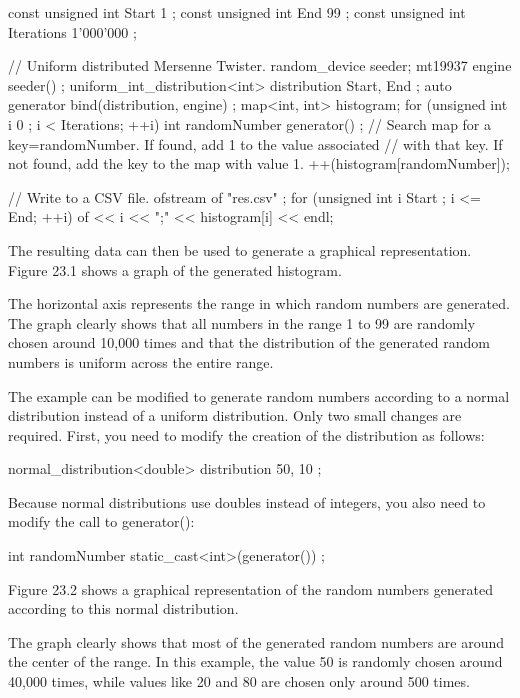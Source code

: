 \begin{cpp}
const unsigned int Start { 1 };
const unsigned int End { 99 };
const unsigned int Iterations { 1'000'000 };

// Uniform distributed Mersenne Twister.
random_device seeder;
mt19937 engine { seeder() };
uniform_int_distribution<int> distribution { Start, End };
auto generator { bind(distribution, engine) };
map<int, int> histogram;
for (unsigned int i { 0 }; i < Iterations; ++i) {
    int randomNumber { generator() };
    // Search map for a key=randomNumber. If found, add 1 to the value associated
    // with that key. If not found, add the key to the map with value 1.
    ++(histogram[randomNumber]);
}

// Write to a CSV file.
ofstream of { "res.csv" };
for (unsigned int i { Start }; i <= End; ++i) {
    of << i << ";" << histogram[i] << endl;
}
\end{cpp}

The resulting data can then be used to generate a graphical representation. Figure 23.1 shows a graph of the generated histogram.

The horizontal axis represents the range in which random numbers are generated. The graph clearly shows that all numbers in the range 1 to 99 are randomly chosen around 10,000 times and that the distribution of the generated random numbers is uniform across the entire range.


The example can be modified to generate random numbers according to a normal distribution instead of a uniform distribution. Only two small changes are required. First, you need to modify the creation of the distribution as follows:

\begin{cpp}
normal_distribution<double> distribution { 50, 10 };
\end{cpp}

Because normal distributions use doubles instead of integers, you also need to modify the call to generator():

\begin{cpp}
int randomNumber { static_cast<int>(generator()) };
\end{cpp}

Figure 23.2 shows a graphical representation of the random numbers generated according to this normal distribution.


The graph clearly shows that most of the generated random numbers are around the center of the range. In this example, the value 50 is randomly chosen around 40,000 times, while values like 20 and 80 are chosen only around 500 times.


















